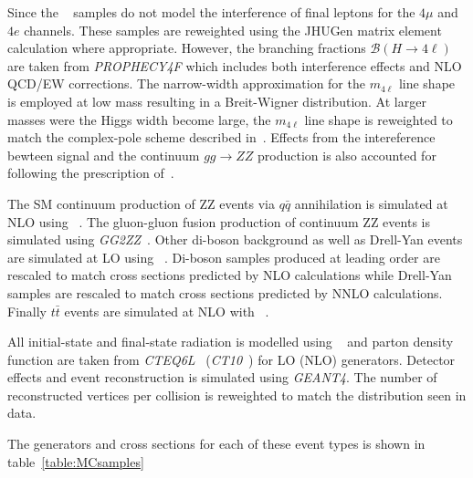 Since the \POWHEG~ samples do not model the interference
of final leptons for the $4\mu$ and $4e$ channels.  These samples
are reweighted using the JHUGen matrix element calculation where
appropriate.  However, the branching fractions 
$\mathscr{B}(H\to 4\ell)$ are taken from {\it PROPHECY4F} which 
includes both interference effects and NLO QCD/EW corrections. 
The narrow-width approximation for the $m_{4\ell}$
line shape is employed at low mass resulting in a Breit-Wigner
distribution.  At larger masses were the Higgs width become large,
the $m_{4\ell}$ line shape is reweighted to match the complex-pole
scheme described in~\cite{???}.  Effects from the intereference
bewteen signal and the continuum $gg\to ZZ$ production is also 
accounted for following the prescription of~\cite{???}.

The SM continuum production of ZZ events via $q\bar{q}$
annihilation is simulated at NLO using \POWHEG~.  The gluon-gluon
fusion production of continuum ZZ events is simulated using
{\it GG2ZZ}~\cite{???}. Other di-boson background as well 
as Drell-Yan events  are simulated at LO using \MADGRAPH~.  
Di-boson samples produced at leading order are rescaled to match
cross sections predicted by NLO calculations while Drell-Yan 
samples are rescaled to match cross sections predicted by NNLO
calculations.  Finally $t\bar{t}$ events are simulated at NLO
with \POWHEG~.

All initial-state and final-state radiation is modelled using 
\PYTHIA~ and parton density function are taken from 
{\it CTEQ6L}~\cite{???} ({\it CT10}~\cite{???}) for LO (NLO) 
generators.  Detector effects and event reconstruction is 
simulated using {\it GEANT4}.  The number of reconstructed 
vertices per collision is reweighted to match the distribution 
seen in data.  

The generators and cross sections for each of these event types 
is shown in table~\ref{table:MCsamples}

